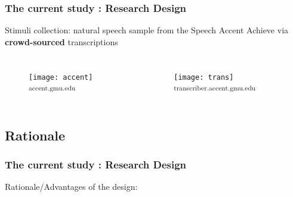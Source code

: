 \documentclass{beamer}
\begin{document}
\begin{frame}
\frametitle{The current study : Research Design}
Stimuli collection: \linebreak
natural speech sample from the Speech Accent Achieve via \textbf{crowd-sourced} transcriptions 
\begin{columns}[c] %
\begin{figure}
\texttt{[image: accent]}
\linebreak \textsubscript{accent.gmu.edu}
\end{figure}
\begin{figure}
\texttt{[image: trans]}
\linebreak \textsubscript{transcriber.accent.gmu.edu}
\end{figure}
\end{columns}
\end{frame}
\subsection{Rationale}
\begin{frame}
\frametitle{The current study : Research Design}
Rationale/Advantages of the design:
\begin{spacing}{2}
\begin{itemize}
\end{itemize}
\end{spacing}
\end{frame}

\end{document}
